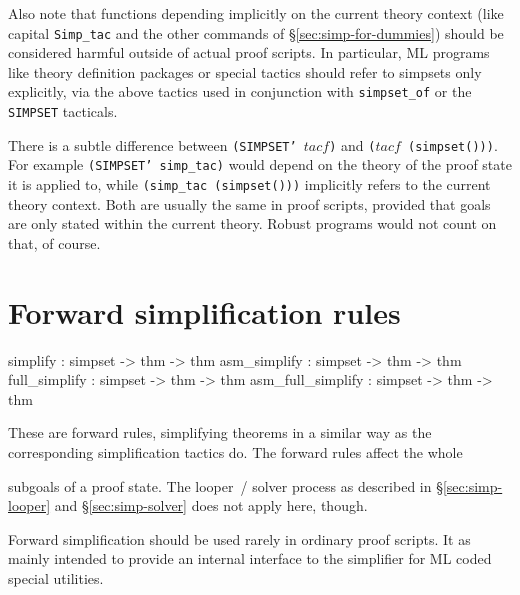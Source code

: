 \medskip

Also note that functions depending implicitly on the current theory
context (like capital \texttt{Simp_tac} and the other commands of
\S\ref{sec:simp-for-dummies}) should be considered harmful outside of
actual proof scripts.  In particular, ML programs like theory
definition packages or special tactics should refer to simpsets only
explicitly, via the above tactics used in conjunction with
\texttt{simpset_of} or the \texttt{SIMPSET} tacticals.

\begin{warn}
  There is a subtle difference between \texttt{(SIMPSET'~$tacf$)} and
  \texttt{($tacf$~(simpset()))}.  For example \texttt{(SIMPSET'
    simp_tac)} would depend on the theory of the proof state it is
  applied to, while \texttt{(simp_tac (simpset()))} implicitly refers
  to the current theory context.  Both are usually the same in proof
  scripts, provided that goals are only stated within the current
  theory.  Robust programs would not count on that, of course.
\end{warn}


\section{Forward simplification rules}
\begin{ttbox}
simplify          : simpset -> thm -> thm
asm_simplify      : simpset -> thm -> thm
full_simplify     : simpset -> thm -> thm
asm_full_simplify : simpset -> thm -> thm
\end{ttbox}

These are forward rules, simplifying theorems in a similar way as the
corresponding simplification tactics do.  The forward rules affect the whole

 subgoals of a proof state.  The
looper~/ solver process as described in \S\ref{sec:simp-looper} and
\S\ref{sec:simp-solver} does not apply here, though.

\begin{warn}
  Forward simplification should be used rarely in ordinary proof
  scripts.  It as mainly intended to provide an internal interface to
  the simplifier for ML coded special utilities.
\end{warn}



